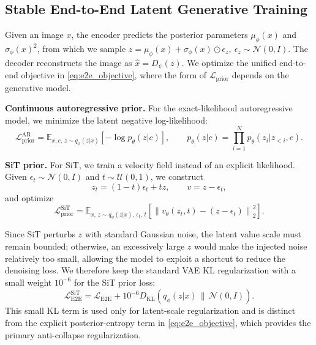 \documentclass[]{bytedance_seed}
\begin{document}
\subsection{Stable End-to-End Latent Generative Training}
\label{subsec:e2e_training}
Given an image $x$, the encoder predicts the posterior parameters
$\mu_\phi(x)$ and $\sigma_\phi(x)^2$, from which we sample
$z =
    \mu_\phi(x)
    +
    \sigma_\phi(x)\odot\epsilon_z,
    \ 
    \epsilon_z\sim\mathcal{N}(0,I)$.
The decoder reconstructs the image as $\hat{x}=D_\psi(z)$. 
We optimize the unified end-to-end objective in \cref{eq:e2e_objective}, where the form of $\mathcal{L}_{\mathrm{prior}}$ depends on the generative model.

\textbf{Continuous autoregressive prior.}
For the exact-likelihood autoregressive model, we minimize the latent
negative log-likelihood:
\begin{equation}
    \mathcal{L}^{\mathrm{AR}}_{\mathrm{prior}}
    =
    \mathbb{E}_{x,c,\,z\sim q_\phi(z|x)}
    \left[
        -\log p_\theta(z|c)
    \right],
    \qquad
    p_\theta(z|c)
    =
    \prod_{i=1}^{N}
    p_\theta(z_i|z_{<i},c).
    \label{eq:prior_loss_ar}
\end{equation}

\textbf{SiT prior.}
For SiT, we train a velocity field instead of an explicit likelihood.
Given $\epsilon_t\sim\mathcal{N}(0,I)$ and
$t\sim\mathcal{U}(0,1)$, we construct
\begin{equation}
    z_t=(1-t)\epsilon_t+t z,
    \qquad
    v=z-\epsilon_t,
\end{equation}
and optimize
\begin{equation}
    \mathcal{L}^{\mathrm{SiT}}_{\mathrm{prior}}
    =
    \mathbb{E}_{x,\,z\sim q_\phi(z|x),\,\epsilon_t,\,t}
    \left[
        \left\|
        v_\theta(z_t,t)-(z-\epsilon_t)
        \right\|_2^2
    \right].
    \label{eq:prior_loss_sit}
\end{equation}

Since SiT perturbs $z$ with standard Gaussian noise, the latent value scale must remain bounded; otherwise, an excessively large $z$ would make the injected noise relatively too small, allowing the model to exploit a shortcut to reduce the denoising loss. 
We therefore keep the standard VAE KL regularization with a small weight $10^{-6}$ for the SiT prior loss:
\begin{equation}
    \mathcal{L}^{\mathrm{SiT}}_{\mathrm{E2E}}
    =
    \mathcal{L}_{\mathrm{E2E}}
    +
    10^{-6}
    D_{\mathrm{KL}}
    \left(
        q_\phi(z|x)\,\|\,\mathcal{N}(0,I)
    \right).
    \label{eq:sit_e2e}
\end{equation}
This small KL term is used only for latent-scale regularization and is distinct from the explicit posterior-entropy term in \cref{eq:e2e_objective}, which provides the primary anti-collapse regularization.
\end{document}
